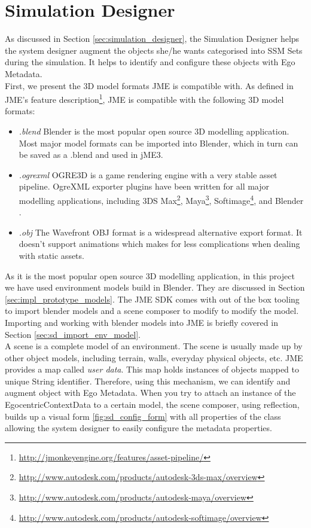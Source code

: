 \section{Simulation Designer} %
\label{sec:impl_simulation_designer}
As discussed in Section \ref{sec:simulation_designer}, the Simulation Designer helps the system designer augment the objects she/he wants categorised into SSM Sets during the simulation. It helps to identify and configure these objects with Ego Metadata.\\

First, we present the 3D model formats JME is compatible with. As defined in JME's feature description\footnote{\url{http://jmonkeyengine.org/features/asset-pipeline/}}, JME is compatible with the following 3D model formats:
\begin{itemize}
	\item \emph{.blend} Blender \cite{blender:online} is the most popular open source 3D modelling application. Most major model formats can be imported into Blender, which in turn can be saved as a .blend and used in jME3.
	\item \emph{.ogrexml} OGRE3D is a game rendering engine with a very stable asset pipeline. OgreXML exporter plugins have been written for all major modelling  applications, including 3DS Max\footnote{\url{http://www.autodesk.com/products/autodesk-3ds-max/overview}}, Maya\footnote{\url{http://www.autodesk.com/products/autodesk-maya/overview}}, Softimage\footnote{\url{http://www.autodesk.com/products/autodesk-softimage/overview}}, and Blender \cite{blender:online}.
	\item \emph{.obj} The Wavefront OBJ format is a widespread alternative export format. It doesn't support animations which makes for less complications when dealing with static assets.
\end{itemize}

As it is the most popular open source 3D modelling application, in this project we have used environment models build in Blender. They are discussed in Section \ref{sec:impl_prototype_models}. The JME SDK comes with out of the box tooling to import blender models and a scene composer to modify to modify the model. Importing and working with blender models into JME is briefly covered in Section \ref{sec:sd_import_env_model}.\\

A scene is a complete model of an environment. The scene is usually made up by other object models, including terrain, walls, everyday physical objects, etc. JME provides a map called \emph{user data}. This map holds instances of objects mapped to unique String identifier. Therefore, using this mechanism, we can identify and augment object with Ego Metadata. When you try to attach an instance of the EgocentricContextData to a certain model, the scene composer, using reflection, builds up a visual form \ref{fig:sd_config_form} with all properties of the class allowing the system designer to easily configure the metadata properties.\\

